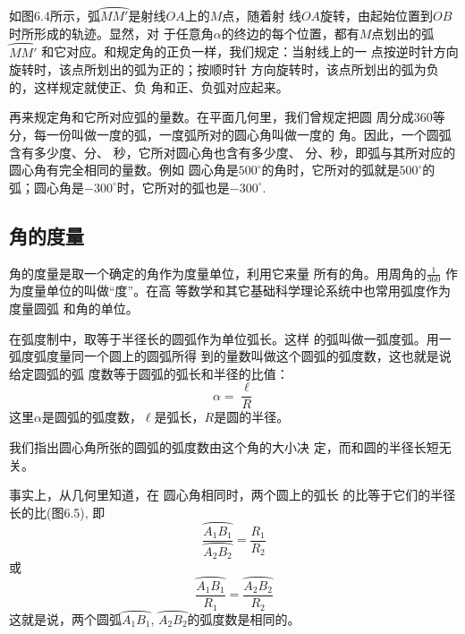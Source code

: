 如图6.4所示，弧$\wideparen{MM'}$是射线$OA$上的$M$点，随着射
线$OA$旋转，由起始位置到$OB$时所形成的轨迹。显然，对
于任意角$\alpha$的终边的每个位置，都有$M$点划出的弧$\wideparen{MM'}$
和它对应。和规定角的正负一样，我们规定：当射线上的一
点按逆时针方向旋转时，该点所划出的弧为正的；按顺时针
方向旋转时，该点所划出的弧为负的，这样规定就使正、负
角和正、负弧对应起来。

再来规定角和它所对应弧的量数。在平面几何里，我们曾规定把圆
周分成360等分，每一份叫做一度的弧，一度弧所对的圆心角叫做一度的
角。因此，一个圆弧含有多少度、分、
秒，它所对圆心角也含有多少度、
分、秒，即弧与其所对应的圆心角有完全相同的量数。例如
圆心角是$500^{\circ}$的角时，它所对的弧就是$500^{\circ}$的弧；圆心角是$-300^{\circ}$时，它所对的弧也是$-300^{\circ}$.

\subsection{角的度量}
角的度量是取一个确定的角作为度量单位，利用它来量
所有的角。用周角的$\frac{1}{360}$
作为度量单位的叫做“度”。在高
等数学和其它基础科学理论系统中也常用弧度作为度量圆弧
和角的单位。

在弧度制中，取等于半径长的圆弧作为单位弧长。这样
的弧叫做一弧度弧。用一弧度弧度量同一个圆上的圆弧所得
到的量数叫做这个圆弧的弧度数，这也就是说给定圆弧的弧
度数等于圆弧的弧长和半径的比值：
\begin{equation}
    \alpha=\frac{\ell}{R}
\end{equation}
这里$\alpha$是圆弧的弧度数，$\ell$是弧长，$R$是圆的半径。

我们指出圆心角所张的圆弧的弧度数由这个角的大小决
定，而和圆的半径长短无关。

事实上，从几何里知道，在
圆心角相同时，两个圆上的弧长
的比等于它们的半径长的比(图6.5), 即
\[\frac{\wideparen{A_1B_1}}{\wideparen{A_2B_2}}=\frac{R_1}{R_2}\]
或\[\frac{\wideparen{A_1B_1}}{R_1}=\frac{\wideparen{A_2B_2}}{R_2}\]
这就是说，两个圆弧$\wideparen{A_1B_1}$, $\wideparen{A_2B_2}$的弧度数是相同的。

\begin{figure}[htp]
    \centering
{}
    \caption{}
\end{figure}

